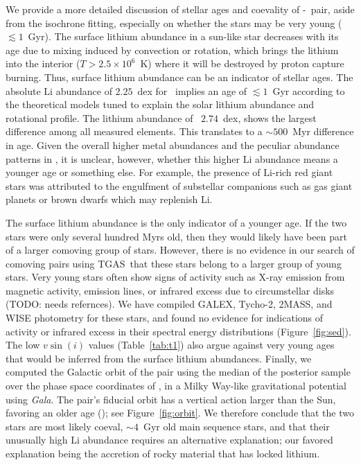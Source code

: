 \documentclass[12pt,letterpaper,margin=1in]{article}
\newcommand{\project}[1]{\textsl{#1}}
\newcommand{\acronym}[1]{{\small{#1}}}
\newcommand{\figname}{Figure}
\newcommand{\tgas}{\acronym{TGAS}}
\newcommand*\elem[1]{\ensuremath{\mathrm{#1}}}
\newcommand{\sunanalog}{\text{Krios}}
\newcommand{\bizarreone}{\text{Kronos}}
\newcommand{\todo}[1]{{\color{red}TODO: #1}}
\renewcommand\tablename{Table}
\begin{document}
We provide a more detailed discussion of stellar ages and coevality of
\bizarreone-\sunanalog\ pair, aside from the isochrone fitting,
especially on whether the stars may be very young ($\lesssim 1$~Gyr).
The surface lithium abundance in a sun-like star decreases with its age due to
mixing induced by convection or rotation, which brings the lithium into the
interior ($T>2.5 \times 10^{6}$~K) where it will be destroyed by proton capture
burning.
Thus, surface lithium abundance can be an indicator of stellar ages.
The absolute $\elem{Li}$ abundance of $2.25$~dex for \sunanalog\ implies an age
of $\lesssim 1$~Gyr according to the theoretical models tuned to explain the
solar lithium abundance and rotational profile\cite{2005Sci...309.2189C}.
The lithium abundance of \bizarreone\, $2.74$~dex, shows the largest difference
among all measured elements.
This translates to a $\sim 500$~Myr difference in age.
Given the overall higher metal abundances and the peculiar abundance patterns
in \bizarreone, it is unclear, however, whether this higher $\elem{Li}$
abundance means a younger age or something else.
For example, the presence of $\elem{Li}$-rich red giant stars was
attributed to the engulfment of substellar companions such as gas giant planets
or brown dwarfs which may replenish $\elem{Li}$\cite{Casey:2016aa}.

The surface lithium abundance is the only indicator of a
younger age.
If the two stars were only several hundred Myrs old, then they would likely
have been part of a larger comoving group of stars.
However, there is no evidence in our search\cite{2017AJ....153..257O} of
comoving pairs using \tgas\ that these stars belong to a larger group of
young stars.
Very young stars often show signs of activity such as
X-ray emission from magnetic activity, emission lines, or infrared excess due to
circumstellar disks (\todo{needs refernces}).
We have compiled GALEX, Tycho-2, 2MASS, and WISE photometry for these stars, and
found no evidence for indications of activity or infrared excess in their
spectral energy distributions (\figname~\ref{fig:sed}).
The low $v\sin(i)$ values (\tablename~\ref{tab:t1}) also argue against very
young ages that would be inferred from the surface lithium abundances.
Finally, we computed the Galactic orbit of the pair using the median of the
posterior sample over the phase space coordinates of \sunanalog, in a Milky
Way-like gravitational potential\cite{Bovy:2015} using \project{Gala}\cite{gala}.
The pair's fiducial orbit has a vertical action larger than the Sun, favoring
an older age (\citealt{Wielen:1977,Aumer:2016}); see \figname~\ref{fig:orbit}.
We therefore conclude that the two stars are most likely coeval, $\sim 4$~Gyr
old main sequence stars, and that their unusually high \elem{Li} abundance
requires an alternative explanation; our favored explanation being the accretion
of rocky material that has locked lithium.
\end{document}
